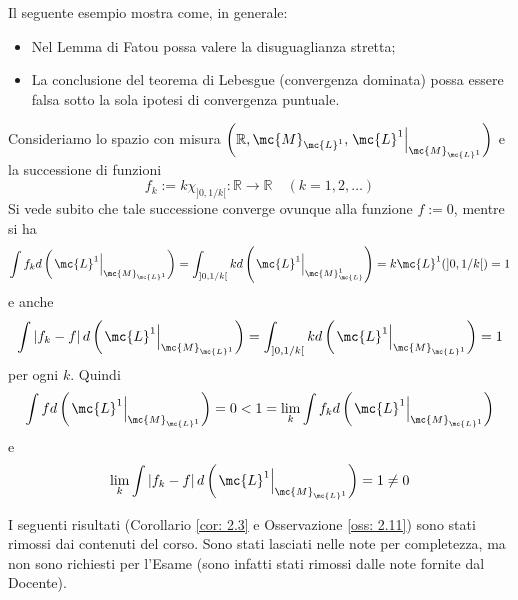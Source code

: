 \begin{oss}
    Il seguente esempio mostra come, in generale:
    \begin{itemize}
      \item Nel Lemma di Fatou possa valere la disuguaglianza stretta;
      \item La conclusione del teorema di Lebesgue (convergenza dominata) possa essere falsa sotto la sola ipotesi di convergenza puntuale.
    \end{itemize}
    Consideriamo lo spazio con misura $\left(\mathbb{R}, \mc{M}_{\mc{L}^{1}},\left.\mc{L}^{1}\right|_{\mc{M}_{\mc{L}^{1}}}\right)$ e la successione di funzioni
    \[f_{k}:=k \chi_{]0,1 / k[}: \mathbb{R} \rightarrow \mathbb{R} \quad(k=1,2, \ldots)\]
    Si vede subito che tale successione converge ovunque alla funzione $f:=0$, mentre si ha
    \[\int f_{k} d\left(\left.\mc{L}^{1}\right|_{\mc{M}_{\mc{L}^1}}\right)=\int_{]0,1 / k[} k d\left(\left.\mc{L}^{1}\right|_{\mc{M}_{\mc{L}}^1}\right)= k\mc{L}^1(]0,1 / k[) = 1\]
    e anche
    \[\int\left|f_{k}-f\right| d\left(\left.\mc{L}^{1}\right|_{\mc{M}_{\mc{L}^{1}}}\right)=\int_{]0,1 / k[} k d\left(\left.\mc{L}^{1}\right|_{\mc{M}_{\mc{L}^{1}}}\right)=1\]
    per ogni $k$. Quindi
    \[\int f d\left(\left.\mc{L}^{1}\right|_{\mc{M}_{\mc{L}^{1}}}\right)=0<1=\lim _{k} \int f_{k} d\left(\left.\mc{L}^{1}\right|_{\mc{M}_{\mc{L}^{1}}}\right)\]
    e
    \[\lim _{k} \int\left|f_{k}-f\right| d\left(\left.\mc{L}^{1}\right|_{\mc{M}_{\mc{L}^{1}}}\right)=1 \neq 0\]
\end{oss}
I seguenti risultati (Corollario \ref{cor: 2.3} e Osservazione \ref{oss: 2.11}) sono stati rimossi dai contenuti del corso. Sono stati lasciati nelle note per completezza, ma non sono richiesti per l'Esame (sono infatti stati rimossi dalle note fornite dal Docente).
